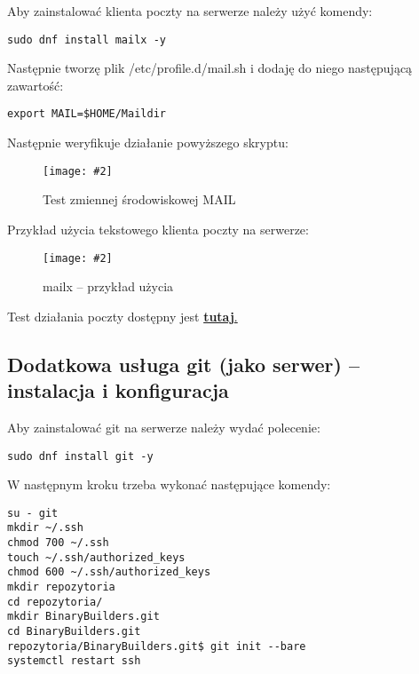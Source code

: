 \documentclass[a4paper]{article}
\newcommand*{\zdj}[2][\textwidth]{\texttt{[image: \#2]}}
\newcommand*{\fg}[4][!htb]{
      \begin{figure*}[#1]
            \zdj{#2}
            \caption[#4]{#3}
      \end{figure*}
}
\begin{document}
\vspace*{-14pt}
Aby zainstalować klienta poczty na serwerze należy użyć komendy:
\vspace*{-5pt}
\begin{Verbatim}[frame=single]
sudo dnf install mailx -y
\end{Verbatim}

\vspace*{-10pt}
Następnie tworzę plik /etc/profile.d/mail.sh i dodaję do niego następującą zawartość:
\vspace*{-5pt}
\begin{Verbatim}[frame=single]
export MAIL=$HOME/Maildir 
\end{Verbatim}

\vspace*{-10pt}
Następnie weryfikuje działanie powyższego skryptu:
\fg{contents/configuration/POP-IMAP/15.png}{Test zmiennej środowiskowej MAIL}{Test zmiennej środowiskowej MAIL}

\newpage
Przykład użycia tekstowego klienta poczty na serwerze:
\fg{contents/configuration/POP-IMAP/16.png}{mailx – przykład użycia}{mailx – przykład użycia}

Test działania poczty dostępny jest \hyperref[fig:poczta-test]{\textbf{tutaj}.}

\subsection{Dodatkowa usługa git (jako serwer) – instalacja i konfiguracja}
Aby zainstalować git na serwerze należy wydać polecenie: 
\begin{Verbatim}[frame=single]
sudo dnf install git -y
\end{Verbatim}

W następnym kroku trzeba wykonać następujące komendy:
\begin{Verbatim}[frame=single]
su - git
mkdir ~/.ssh
chmod 700 ~/.ssh
touch ~/.ssh/authorized_keys
chmod 600 ~/.ssh/authorized_keys
mkdir repozytoria
cd repozytoria/
mkdir BinaryBuilders.git
cd BinaryBuilders.git
repozytoria/BinaryBuilders.git$ git init --bare
systemctl restart ssh
\end{Verbatim}
\end{document}
